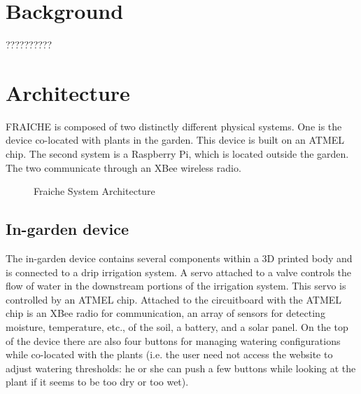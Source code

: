 \documentclass[a4paper]{acm_proc_article-sp}
\begin{document}
\section{Background}

??????????

\section{Architecture}

FRAICHE is composed of two distinctly different physical systems.  One is the device co-located with plants in the garden.  This device is built on an ATMEL chip.  The second system is a Raspberry Pi, which is located outside the garden.  The two communicate through an XBee wireless radio.

\begin{figure}[h!]
  \centering
  \caption{Fraiche System Architecture}
\end{figure}

\subsection{In-garden device}

The in-garden device contains several components within a 3D printed body and is connected to a drip irrigation system.  A servo attached to a valve controls the flow of water in the downstream portions of the irrigation system.  This servo is controlled by an ATMEL chip.  Attached to the circuitboard with the ATMEL chip is an XBee radio for communication, an array of sensors for detecting moisture, temperature, etc., of the soil, a battery, and a solar panel.  On the top of the device there are also four buttons for managing watering configurations while co-located with the plants (i.e. the user need not access the website to adjust watering thresholds: he or she can push a few buttons while looking at the plant if it seems to be too dry or too wet).
\end{document}
